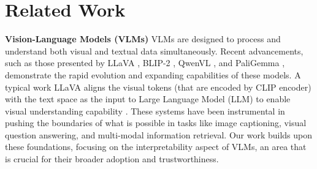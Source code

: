 \section{Related Work}
\label{sec:related_work}


\noindent\textbf{Vision-Language Models (VLMs)} VLMs are designed to process and understand both visual and textual data simultaneously.  Recent advancements, such as those presented by LLaVA \cite{liu2023llava}, BLIP-2 \cite{li2023blip}, QwenVL \cite{bai2023qwen}, and PaliGemma \cite{beyer2024paligemma}, demonstrate the rapid evolution and expanding capabilities of these models. A typical work LLaVA aligns the visual tokens (that are encoded by CLIP encoder) with the text space as the input to Large Language Model (LLM) to enable visual understanding capability \cite{liu2023llava,liu2023improvedllava}. These systems have been instrumental in pushing the boundaries of what is possible in tasks like image captioning, visual question answering, and multi-modal information retrieval. Our work builds upon these foundations, focusing on the interpretability aspect of VLMs, an area that is crucial for their broader adoption and trustworthiness.



